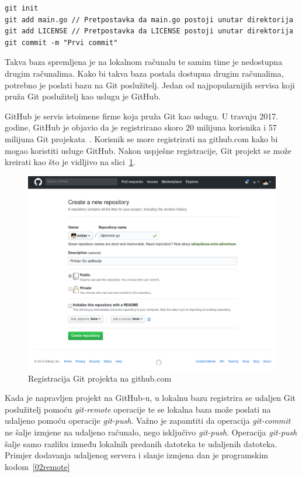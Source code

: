 \begin{lstlisting}[float=h]
git init
git add main.go // Pretpostavka da main.go postoji unutar direktorija
git add LICENSE // Pretpostavka da LICENSE postoji unutar direktorija
git commit -m "Prvi commit"
\end{lstlisting}

Takva baza spremljena je na lokalnom računalu te samim time je nedostupna drugim računalima. Kako bi
takva baza postala dostupna drugim računalima, potrebno je poslati bazu na Git poslužitelj. Jedan
od najpopularnijih servisa koji pruža Git poslužitelj kao uslugu je GitHub.

GitHub je servis istoimene firme koja pruža Git kao uslugu. U travnju 2017. godine, GitHub je
objavio da je registrirano skoro 20 milijuna korisnika i 57 milijuna Git
projekata~\citep{github2017}. Korisnik se more registrirati na github.com kako bi mogao koristiti
usluge GitHub. Nakon uspješne registracije, Git projekt se može kreirati kao što je vidljivo na
slici~\ref{fig:02hgreg}.

\begin{figure}[h]
    \centering
    \includegraphics[width=0.7\linewidth]{img/02/gh.png}
    \caption{Registracija Git projekta na github.com}%
    \label{fig:02hgreg}
\end{figure}

Kada je napravljen projekt na GitHub-u, u lokalnu bazu registrira se udaljen Git poslužitelj pomoću
\textit{git-remote} operacije te se lokalna baza može poslati na udaljeno pomoću operacije
\textit{git-push}. Važno je zapamtiti da operacija \textit{git-commit} ne šalje izmjene na udaljeno
računalo, nego isključivo \textit{git-push}.  Operacija \textit{git-push} šalje samo razliku između
lokalnih predanih datoteka te udaljenih datoteka.  Primjer dodavanja udaljenog servera i slanje
izmjena dan je programskim kodom~\ref{02remote}


